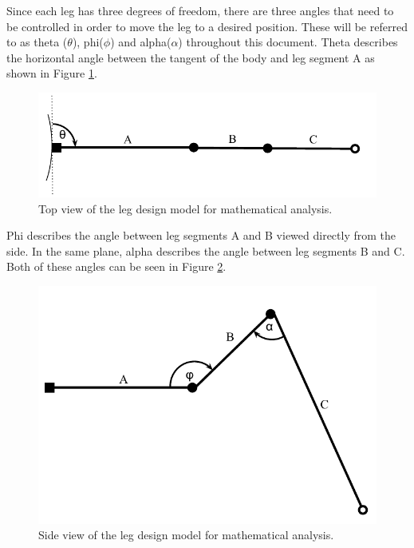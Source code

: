 Since each leg has three degrees of freedom, there are three angles that need to be controlled in order to move the leg to a desired position. These will be referred to as theta ($\theta$), phi($\phi$) and alpha($\alpha$) throughout this document. Theta describes the horizontal angle between the tangent of the body and leg segment A as shown in Figure \ref{fig:Leg_design_2}. 

\FloatBarrier
\begin{figure}[h]
\centering
\includegraphics[scale = 1]{pics/Leg_design_2.pdf}
\caption{Top view of the leg design model for mathematical analysis.}
\label{fig:Leg_design_2}
\end{figure}
\FloatBarrier

Phi describes the angle between leg segments A and B viewed directly from the side. In the same plane, alpha describes the angle between leg segments B and C. Both of these angles can be seen in Figure \ref{fig:Leg_design}.

\FloatBarrier
\begin{figure}[h]
\centering
\includegraphics[scale = 1]{pics/Leg_design.pdf}
\caption{Side view of the leg design model for mathematical analysis.}
\label{fig:Leg_design}
\end{figure}
\FloatBarrier

